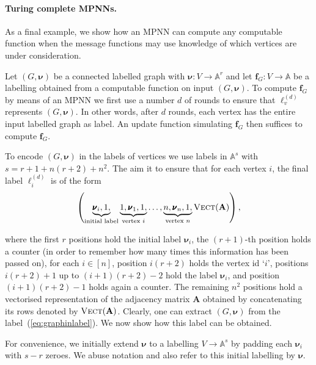 \paragraph{Turing complete MPNNs.}
 As a final example, we show how an MPNN can compute any computable function when the message functions may use knowledge of which vertices are under consideration. 
\begin{example}
	Let $( G,\pmb{\nu})$ be a connected labelled graph with $\pmb{\nu}:V\to\mathbb{A}^r$ and let $\mathbf{f}_G:V\to\mathbb{A}$ be a labelling 
	obtained from a computable function on input 	$( G,\pmb{\nu})$. To compute $\mathbf{f}_G$ by means of an MPNN we first use a number $d$ of rounds to ensure that $\pmb{\ell}^{(d)}_v$ represents $( G,\pmb{\nu})$. In other words, after $d$ rounds, each vertex has the entire input labelled graph as label. An update function simulating $\mathbf{f}_G$ then suffices to compute $\mathbf{f}_G$.
	
To encode $( G,\pmb{\nu})$ in the labels of vertices we use labels in $\mathbb{A}^s$ with 
$s=r+1+n(r+2)+n^2$. The aim it to ensure that for each vertex $i$, the final label $\pmb{\ell}_i^{(d)}$ is of the form
\begin{equation}
\left(\underbrace{\pmb{\nu}_i,1,}_{\text{initial label}}\underbrace{1,\pmb{\nu}_1,1,}_{\text{vertex $i$}}\ldots,\underbrace{n,\pmb{\nu}_n,1,}_{\text{vertex $n$}}\textsc{Vect}(\mathbf{A})\right), \label{eq:graphinlabel}
\end{equation}

where the first $r$ positions hold the initial label $\pmb{\nu}_i$,
the $(r+1)$-th position holds a counter (in order to remember how many times
this information has been passed on), for each $i\in[n]$, position
$i(r+2)$ holds the vertex id `$i$', positions $i(r+2)+1$ up to $(i+1)(r+2)-2$
hold the label $\pmb{\nu}_i$, and position $(i+1)(r+2)-1$ holds again a counter.
The remaining $n^2$ positions hold a vectorised representation of the adjacency matrix $\mathbf{A}$ obtained by concatenating its rows denoted by $\textsc{Vect}(\mathbf{A})$. Clearly, one can extract 
$(G,\pmb{\nu})$ from the label~(\ref{eq:graphinlabel}). We now show how this label can be obtained.

For convenience, we initially extend $\pmb{\nu}$
to a labelling $V\to\mathbb{A}^s$ by padding each $\pmb{\nu}_i$ with $s-r$ zeroes. We abuse notation and also refer to this initial labelling by $\pmb{\nu}$.


\end{example}
